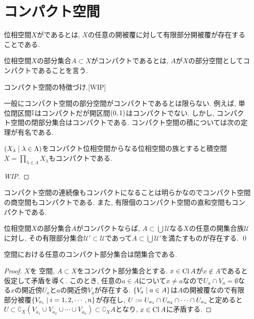 \documentclass[uplatex, dvipdfmx, a4paper, 12pt, class=jsbook, crop=false]{standalone}
\begin{document}
\section{コンパクト空間}
\label{sec:compact-spaces}

\begin{definition}
	位相空間$ X $がであるとは, $ X $の任意の開被覆に対して有限部分開被覆が存在することである.
\end{definition}

位相空間$ X $の部分集合$ A \subset X $がコンパクトであるとは, $ A $が$ X $の部分空間としてコンパクトであることを言う.

\begin{proposition}
	コンパクト空間の特徴づけ.[WIP]
\end{proposition}

一般にコンパクト空間の部分空間がコンパクトであるとは限らない.
例えば, 単位閉区間$ \mathbb{I} $はコンパクトだが開区間$ \left( 0 , 1 \right) $はコンパクトでない.
しかし, コンパクト空間の閉部分集合はコンパクトである. コンパクト空間の積については次の定理が有名である.

\begin{theorem}[\Tychonoff]
	\label{Tychonoff's theorem}
	$ \setfamily{X_\lambda}{\lambda \in \Lambda} $をコンパクト位相空間からなる位相空間の族とすると積空間$ X = \prod_{\lambda \in \Lambda} X_\lambda $もコンパクトである.
\end{theorem}

\begin{proof}
	[WIP]
\end{proof}

コンパクト空間の連続像もコンパクトになることは明らかなのでコンパクト空間の商空間もコンパクトである.
また, 有限個のコンパクト空間の直和空間もコンパクトである.

\begin{proposition}
	位相空間$ X $の部分集合$ A $がコンパクトならば, $ A \subset \bigcup \mathscr{U} $なる$ X $の任意の開集合族$ \mathscr{U} $に対し, その有限部分集合$ \mathscr{U}' \subset \mathscr{U} $であって$ A \subset \bigcup \mathscr{U}' $を満たすものが存在する.
	\qed
\end{proposition}


\begin{proposition}
	\Hausdorff 空間における任意のコンパクト部分集合は閉集合である.
\end{proposition}
\begin{proof}
	$ X $を \Hausdorff 空間, $ A \subset X $をコンパクト部分集合とする.
	$ x \in \mathop{\mathrm{Cl}}\nolimits A $が$ x \notin A $であると仮定して矛盾を導く.
	このとき, 任意の$ a \in A $について$ x \neq a $なので$ U_a \cap V_a = \emptyset $なる$ x $の開近傍$ U_a $と$ a $の開近傍$ V_a $が存在する.
	$ \setcomp{V_a}{a \in A} $は$ A $の開被覆なので有限部分被覆$ \setcomp{V_{a_i}}{i=1, 2,\cdots, n} $が存在し, $ U \mathrel{:=} U_{a_1} \cap U_{a_2} \cap \cdots \cap U_{a_n} $と定めると$ U \subset \complement_X (V_{a_1} \cup V_{a_2} \cup \cdots \cup V_{a_n}) \subset \complement_X A $となり, $ x \in \mathop{\mathrm{Cl}}\nolimits A $に矛盾する.
\end{proof}
\end{document}
